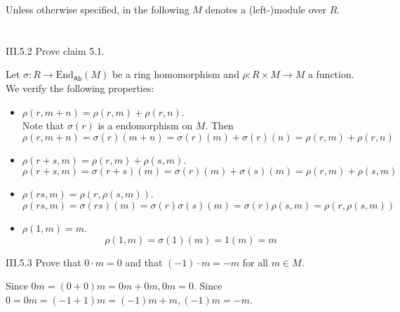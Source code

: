 \el

Unless otherwise specified, in the following $M$ denotes a (left-)module over $R$.

\section{}

\begin{problem}{III.5.2}
Prove claim 5.1.
\end{problem}
\begin{pf}
Let $\sigma : R \to \text{End}_\mathsf{Ab}(M)$ be a ring homomorphism and $\rho : R \times M \to M$ a function. We verify the following properties:
\begin{itemize}
\setlength\itemsep{0pt}
\item $\rho(r,m+n) = \rho(r,m) + \rho(r,n)$. \\
Note that $\sigma(r)$ is a endomorphism on $M$. Then 
\[
\rho(r,m+n) = \sigma(r)(m+n) = \sigma(r)(m) + \sigma(r)(n) = \rho(r,m) + \rho(r,n)	
\] 
\item $\rho(r+s, m) = \rho(r,m) + \rho(s,m)$. 
\[
\rho(r+s, m) = \sigma(r+s)(m) = \sigma(r)(m) + \sigma(s)(m) = \rho(r,m) + \rho(s,m)
\]
\item $\rho(rs,m) = \rho(r,\rho(s,m))$. 
\[
\rho(rs,m) = \sigma(rs)(m) = \sigma(r)\sigma(s)(m) = \sigma(r)\rho(s,m) = \rho(r,\rho(s,m))
\]
\item $\rho(1,m) = m$. 
\[
\rho(1,m) = \sigma(1)(m) = 1(m) = m	
\]
\end{itemize}
\end{pf}

\begin{problem}{III.5.3}
Prove that $0\cdot m = 0$ and that $(-1) \cdot m = -m$ for all $m \in M$. 
\end{problem}
\begin{pf}
Since $0m = (0+0)m = 0m + 0m, 0m = 0$. Since $0 = 0m = (-1+1)m = (-1)m+m, (-1)m = -m$.
\end{pf}

